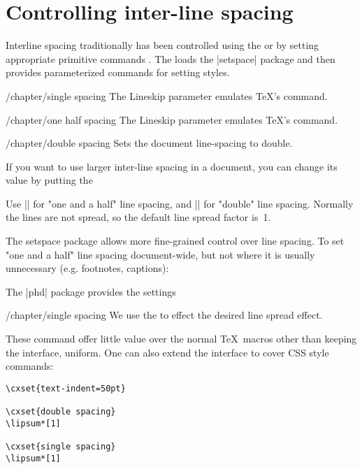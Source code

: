 \section{Controlling inter-line spacing}
Interline spacing traditionally has been controlled using the  or by setting appropriate primitive \tex commands \cite{setspace}. The  loads the |setspace| package and then provides parameterized commands for setting styles. 

\begin{key}{/chapter/single spacing} 
	The Lineskip parameter emulates \TeX's \cmd{\parindent} command.
\end{key}
\begin{key}{/chapter/one half spacing} 
	The Lineskip parameter emulates \TeX's \cmd{\parindent} command.
\end{key}
\begin{key}{/chapter/double spacing} 
	Sets the document line-spacing to double.
\end{key}

If you want to use larger inter-line spacing in a document, you can change its value by putting the

\CMDI{\linespread} Use |\linespread{1.3}| for "one and a half" line spacing, and |\linespread{1.6}| for "double" line spacing. Normally the lines are not spread, so the default line spread factor is~1.

The setspace package allows more fine-grained control over line spacing. To set "one and a half" line spacing document-wide, but not where it is usually unnecessary (e.g. footnotes, captions):

\begin{teXXX}
\usepackage{setspace}
\onehalfspacing
\end{teXXX}

The |phd| package provides the settings

\begin{key}{/chapter/single spacing}
We use the  to effect the desired line spread effect.
\end{key}


These command offer little value over the normal \TeX\ macros other than keeping the interface, uniform. One can also extend the interface to cover CSS style commands:

\begin{verbatim}
\cxset{text-indent=50pt}

\cxset{double spacing}
\lipsum*[1]

\cxset{single spacing}
\lipsum*[1]
\end{verbatim}



